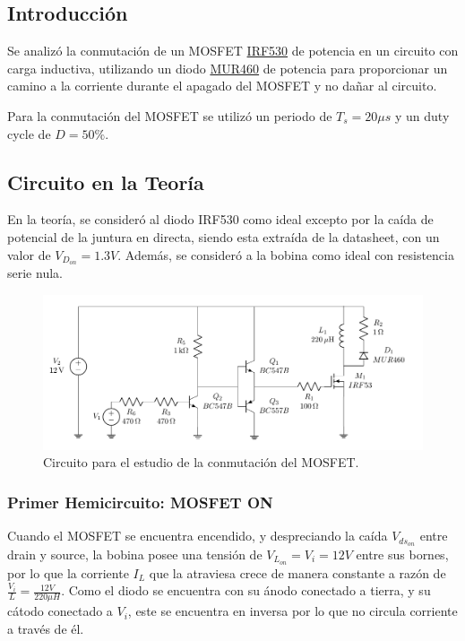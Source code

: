 



\subsection{Introducción}

Se analizó la conmutación de un MOSFET \href{https://www.vishay.com/docs/91019/91019.pdf}{IRF530} de potencia en un circuito con carga inductiva, utilizando un diodo \href{https://www.onsemi.com/pdf/datasheet/mur420-d.pdf}{MUR460} de potencia para proporcionar un camino a la corriente durante el apagado del MOSFET y no dañar al circuito.


Para la conmutación del MOSFET se utilizó un periodo de $T_s = 20 \mu s$ y un duty cycle de $D = 50 \%$.

\subsection{Circuito en la Teoría}

En la teoría, se consideró al diodo IRF530 como ideal excepto por la caída de potencial de la juntura en directa, siendo esta extraída de la datasheet, con un valor de $V_{D_{on}} = 1.3V$. Además, se consideró a la bobina como ideal con resistencia serie nula.

\begin{figure}[H]
	\centering
	\includegraphics[width=0.7\linewidth, page=1]{ImagenesEjercicio-1/CircuitsEj1}
	\caption{Circuito para el estudio de la conmutación del MOSFET.}
	\label{fig:ej1:circuito}
\end{figure}

\subsubsection{Primer Hemicircuito: MOSFET ON}

Cuando el MOSFET se encuentra encendido, y despreciando la caída $V_{ds_{on}}$ entre drain y source, la bobina posee una tensión de $V_{L_{on}} = V_i = 12V$ entre sus bornes, por lo que la corriente $I_L$ que la atraviesa crece de manera constante a razón de $\frac{V_i}{L} = \frac{12V}{220\mu H}$. Como el diodo se encuentra con su ánodo conectado a tierra, y su cátodo conectado a $V_i$, este se encuentra en inversa por lo que no circula corriente a través de él.


